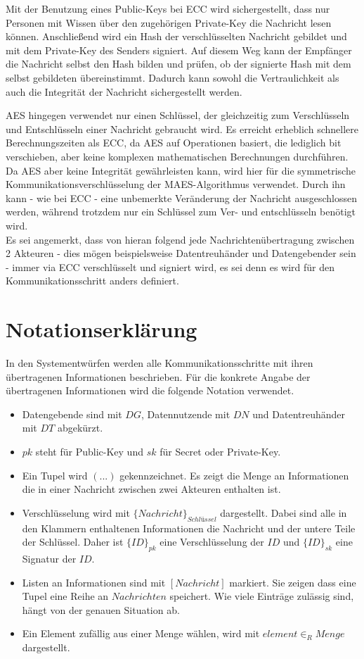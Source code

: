 \documentclass{scrreprt}
\begin{document}
Mit der Benutzung eines Public-Keys bei ECC wird sichergestellt, dass nur Personen mit Wissen über den zugehörigen Private-Key die Nachricht lesen können. Anschließend wird ein Hash der verschlüsselten Nachricht gebildet und mit dem Private-Key des Senders signiert. Auf diesem Weg kann der Empfänger die Nachricht selbst den Hash bilden und prüfen, ob der signierte Hash mit dem selbst gebildeten übereinstimmt. Dadurch kann sowohl die Vertraulichkeit als auch die Integrität der Nachricht sichergestellt werden.

AES hingegen verwendet nur einen Schlüssel, der gleichzeitig zum Verschlüsseln und Entschlüsseln einer Nachricht gebraucht wird. Es erreicht erheblich schnellere Berechnungszeiten als ECC, da AES auf Operationen basiert, die lediglich bit verschieben, aber keine komplexen mathematischen Berechnungen durchführen. Da AES aber keine Integrität gewährleisten kann, wird hier für die symmetrische Kommunikationsverschlüsselung der MAES-Algorithmus verwendet. Durch ihn kann - wie bei ECC - eine unbemerkte Veränderung der Nachricht ausgeschlossen werden, während trotzdem nur ein Schlüssel zum Ver- und entschlüsseln benötigt wird.\\

Es sei angemerkt, dass von hieran folgend jede Nachrichtenübertragung zwischen 2 Akteuren - dies mögen beispielsweise Datentreuhänder und Datengebender sein - immer via ECC verschlüsselt und signiert wird, es sei denn es wird für den Kommunikationsschritt anders definiert.

\section{Notationserklärung}
In den Systementwürfen werden alle Kommunikationsschritte mit ihren übertragenen Informationen beschrieben. Für die konkrete Angabe der übertragenen Informationen wird die folgende Notation verwendet.
\begin{itemize}
    \item Datengebende sind mit $DG$, Datennutzende mit $DN$ und Datentreuhänder mit $DT$ abgekürzt.
    \item $pk$ steht für Public-Key und $sk$ für Secret oder Private-Key.
    \item Ein Tupel wird $(...)$ gekennzeichnet. Es zeigt die Menge an Informationen die in einer Nachricht zwischen zwei Akteuren enthalten ist.
    \item Verschlüsselung wird mit ${\{Nachricht\}}_{Schl\textit{ü}ssel}$ dargestellt. Dabei sind alle in den Klammern enthaltenen Informationen die Nachricht und der untere Teile der Schlüssel. Daher ist ${\{ID\}}_{pk}$ eine Verschlüsselung der $ID$ und ${\{ID\}}_{sk}$ eine Signatur der $ID$.
    \item Listen an Informationen sind mit $[Nachricht]$ markiert. Sie zeigen dass eine Tupel eine Reihe an $Nachrichten$ speichert. Wie viele Einträge zulässig sind, hängt von der genauen Situation ab.
    \item Ein Element zufällig aus einer Menge wählen, wird mit $element {\in}_{R} Menge$ dargestellt.
\end{itemize}
\end{document}
